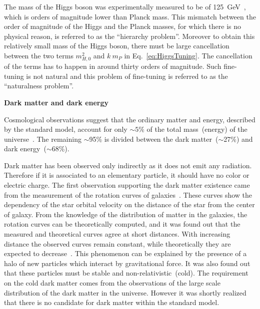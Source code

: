 The mass of the Higgs boson was experimentally measured to be of 125~GeV~\cite{Chatrchyan:2012xdj, Aad:2012tfa}, which is orders of magnitude lower than Planck mass. This mismatch between the order of magnitude of the Higgs and the Planck masses, for which there is no physical reason, is referred to as the ``hierarchy problem''. Moreover to obtain this relatively small mass of the Higgs boson, there must be large cancellation between the two terms $m_{H, 0}^{2}$ and $k ~m_{P}$  in Eq.~\ref{eq:HiggsTuning}. The cancellation of the terms has to happen in around thirty orders of magnitude. Such fine-tuning is not natural and this problem of fine-tuning is referred to as the ``naturalness problem''.


\textbf{Dark matter and dark energy}

Cosmological observations suggest that the ordinary matter and energy, described by the standard model, account for only $\sim 5\%$ of the total mass~(energy) of the universe~\cite{Bertone:2004pz, Bennett:2012zja}. The remaining $\sim$95\% is divided between the dark matter~($\sim$27\%) and dark energy~($\sim$68\%).

Dark matter has been observed only indirectly as it does not emit any radiation. Therefore if it is associated to an elementary particle, it should have no color or electric charge. The first observation supporting the dark matter existence came from the measurement of the rotation curves of galaxies~\cite{Zwicky:1937zza, Rubin:1980zd}. These curves show the dependency of the star orbital velocity on the distance of the star from the center of galaxy. From the knowledge of the distribution of matter in the galaxies, the rotation curves can be theoretically computed, and it was found out that the measured and theoretical curves agree at short distances. With increasing distance the observed curves remain constant, while theoretically they are expected to decrease~\cite{Bertone:2004pz}. This phenomenon can be explained by the presence of a halo of new particles which interact by gravitational force. It was also found out that these particles must be stable and non-relativistic~(cold). The requirement on the cold dark matter comes from the observations of the large scale distribution of the dark matter in the universe. However it was shortly realized that there is no candidate for dark matter within the standard model.

